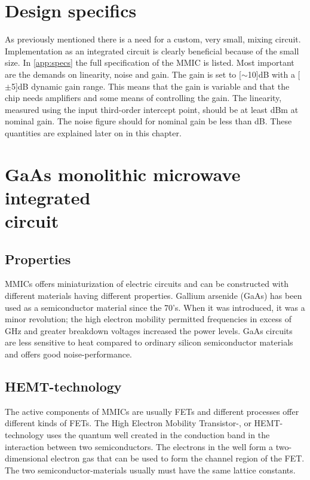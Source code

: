 	\section{Design specifics}
		As previously mentioned there is a need for a custom, very small, mixing circuit. Implementation as an integrated circuit is clearly beneficial because of the small size. In \autoref{app:specs} the full specification of the MMIC is listed. Most important are the demands on linearity, noise and gain. The gain is set to \unit[$\sim$10]{dB} with a \unit[$\pm$5]{dB} dynamic gain range. This means that the gain is variable and that the chip needs amplifiers and some means of controlling the gain. The linearity, measured using the input third-order intercept point, should be at least \unit[15]{dBm} at nominal gain. The noise figure should for nominal gain be less than \unit[15]{dB}. These quantities are explained later on in this chapter.


	\section{GaAs monolithic microwave integrated \\circuit}
		\subsection{Properties}

		MMICs offers miniaturization of electric circuits and can be constructed with different materials having different properties. Gallium arsenide (GaAs) has been used as a semiconductor material since the 70's. When it was introduced, it was a minor revolution; the high electron mobility permitted frequencies in excess of \unit[200]{GHz} and greater breakdown voltages increased the power levels. GaAs circuits are less sensitive to heat compared to ordinary silicon semiconductor materials and offers good noise-performance.\autocite{robertson95} %

		\subsection{HEMT-technology}
			The active components of MMICs are usually FETs and different processes offer different kinds of FETs.	The High Electron Mobility Transistor-, or HEMT-technology uses the quantum well created in the conduction band in the interaction between two semiconductors. The electrons in the well form a two-dimensional electron gas that can be used to form the channel region of the FET.\autocite{mimura80} The two semiconductor-materials usually must have the same lattice constants.

